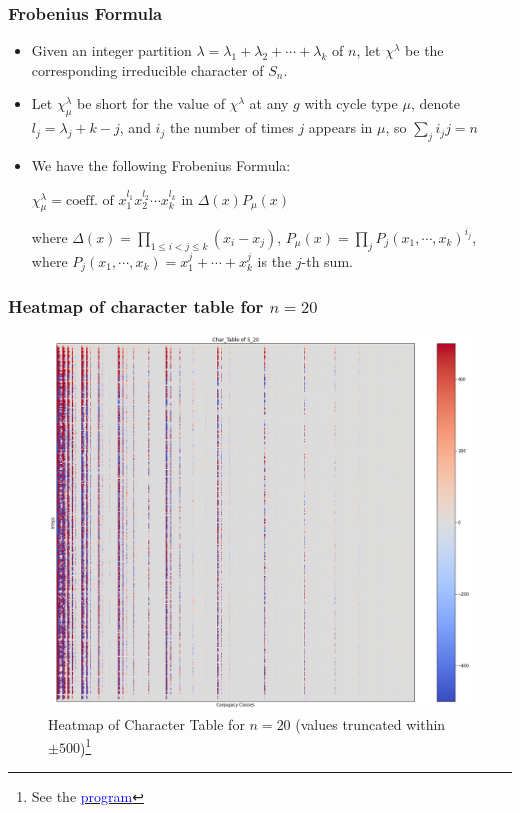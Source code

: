 \documentclass{beamer}
\begin{document}
\begin{frame}
\frametitle{Frobenius Formula}
\begin{theorem} 
    \begin{itemize}
\item Given an integer partition $\lambda = \lambda_1 + \lambda_2 + \cdots + \lambda_k$ of $n$, let $\chi^{\lambda}$ be the corresponding irreducible character of $S_n$. 
\item Let $\chi^{\lambda}_{\mu}$ be short for the value of $\chi^{\lambda}$ at any $g$ with cycle type $\mu$, denote $l_j  =\lambda_j + k - j$, and $i_j$ the number of times $j$ appears in $\mu$, so $\sum\limits_j i_jj = n$
\item We have the following Frobenius Formula: 

 $\chi^{\lambda}_{\mu} = \text{coeff. of }  x_{1}^{l_1} x_{2}^{l_2}\cdots x_{k}^{l_k}$ in $\Delta(x) P_{\mu}(x)$
 
  
where $\Delta(x) = \prod\limits_{1 \leq i < j \leq k} (x_i-x_j)$, $P_\mu(x) = \prod\limits_j P_j(x_1,\cdots, x_k)^{i_j}$, where $P_j(x_1,\cdots, x_k) = x_1^j + \cdots + x_k^j$ is the $j$-th sum.
\end{itemize}
\end{theorem}
\end{frame}


\begin{frame}
\frametitle{Heatmap of character table for $n=20$}
\begin{figure}[H]
  \centering
  \includegraphics[width=0.6\linewidth]{char_table_20.png}
  \begin{center}
      \caption{\tiny Heatmap of Character Table for $n=20$ (values truncated within $\pm 500$)\footnote{ \tiny See the \href{https://github.com/TonyZhang2004/Character_Table_of_Symmetric_Groups/blob/main/char_table.ipynb}{\textcolor{blue}{program}}}}
  \end{center}
  
  \label{fig:char_20}
\end{figure}
\end{frame}
\end{document}

